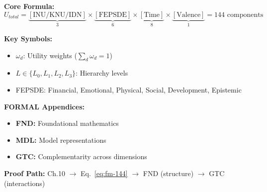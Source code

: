 \begin{tcolorbox}[colback=blue!3!white, colframe=blue!60!black,
    title=\textbf{Chapter 10: WHAT (Utility) + WHO (Levels) + HIERARCHY}]

\textbf{Core Formula:}
\begin{equation}
U_{total} = \underbrace{[\text{INU/KNU/IDN}]}_{3} \times \underbrace{[\text{FEPSDE}]}_{6} \times \underbrace{[\text{Time}]}_{8} \times \underbrace{[\text{Valence}]}_{1} = 144 \text{ components}
\label{eq:fm-144}
\end{equation}

\textbf{Key Symbols:}
\begin{itemize}[nosep]
    \item $\omega_d$: Utility weights ($\sum_d \omega_d = 1$)
    \item $L \in \{L_0, L_1, L_2, L_3\}$: Hierarchy levels
    \item FEPSDE: Financial, Emotional, Physical, Social, Development, Epistemic
\end{itemize}

\textbf{FORMAL Appendices:}
\begin{itemize}[nosep]
    \item \textbf{FND:} Foundational mathematics
    \item \textbf{MDL:} Model representations
    \item \textbf{GTC:} Complementarity across dimensions
\end{itemize}

\textbf{Proof Path:} Ch.10 $\rightarrow$ Eq.~\ref{eq:fm-144} $\rightarrow$ FND (structure) $\rightarrow$ GTC (interactions)

\end{tcolorbox}


